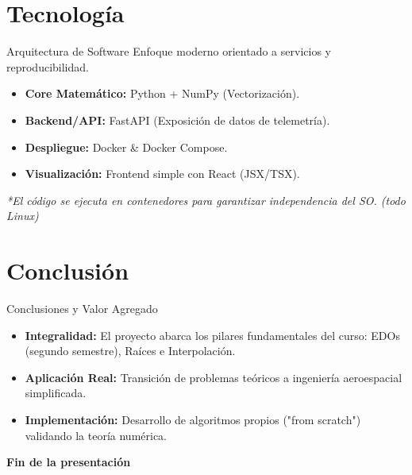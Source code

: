 \documentclass[aspectratio=169]{beamer}
\begin{document}
\section{Tecnología}

\begin{frame}{Arquitectura de Software}
  Enfoque moderno orientado a servicios y reproducibilidad.
  
  \vspace{0.5cm}
  
  \begin{itemize}
      \item \textbf{Core Matemático:} Python + NumPy (Vectorización).
      \item \textbf{Backend/API:} FastAPI (Exposición de datos de telemetría).
      \item \textbf{Despliegue:} Docker \& Docker Compose.
      \item \textbf{Visualización:} Frontend simple con React (JSX/TSX).
  \end{itemize}

  \vspace{0.5cm}
  \centering
  \small{\textit{*El código se ejecuta en contenedores para garantizar independencia del SO. (todo Linux)}}
\end{frame}


\section{Conclusión}

\begin{frame}{Conclusiones y Valor Agregado}
  \begin{itemize}
      \item \textbf{Integralidad:} El proyecto abarca los pilares fundamentales del curso: EDOs (segundo semestre), Raíces e Interpolación.
      \item \textbf{Aplicación Real:} Transición de problemas teóricos a ingeniería aeroespacial simplificada.
      \item \textbf{Implementación:} Desarrollo de algoritmos propios ("from scratch") validando la teoría numérica.
  \end{itemize}
  
  \vspace{1cm}
  \centering
  \textbf{\Large Fin de la presentación}
\end{frame}
\end{document}
